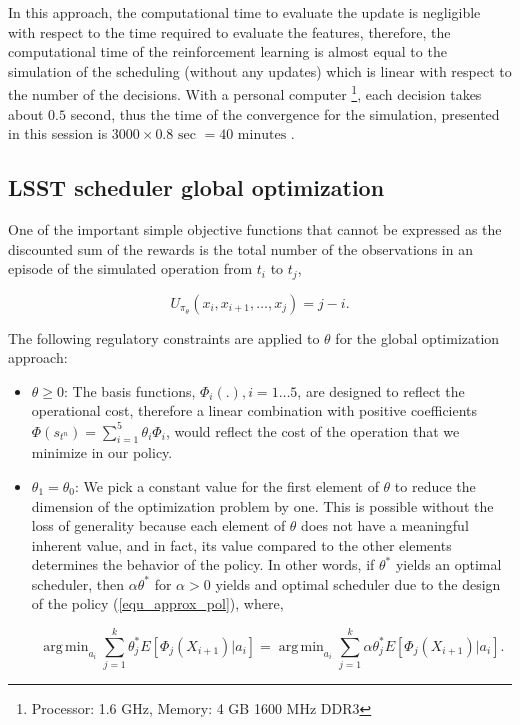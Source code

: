 \documentclass[12pt,aas_macros]{article}
\theoremstyle{definition}
\DeclareMathOperator*{\argmin}{arg\,min}
\begin{document}
In this approach, the computational time to evaluate the update is negligible with respect to the time required to evaluate the features, therefore, the computational time of the reinforcement learning is almost equal to the simulation of the scheduling (without any updates) which is linear with respect to the number of the decisions. With a personal computer \footnote{Processor: 1.6 GHz, Memory: 4 GB 1600 MHz DDR3}, each decision takes about $0.5$ second, thus the time of the convergence for the simulation, presented in this session is $3000\times 0.8 \text{ sec } = 40 \text{ minutes }$.

\subsection{LSST scheduler global optimization}

One of the important simple objective functions that cannot be expressed as the discounted sum of the rewards is the total number of the observations in an episode of the simulated operation from $t_i$ to $t_j$,

\begin{equation}\label{equ_lsst_ede}
U_{\pi_{\theta}}(x_i, x_{i+1}, \dots, x_j) = j - i.
\end{equation}

The following regulatory constraints are applied to $\theta$ for the global optimization approach:

\begin{itemize}
\item $\theta \geq 0$: The basis functions, $\Phi_i(.), i = 1\dots 5$, are designed to reflect the operational cost, therefore a linear combination with positive coefficients $\Phi(s_{t^n})= \sum_{i=1}^5 \theta_i \Phi_i$, would reflect the cost of the operation that we minimize in our policy.

\item $\theta_1 =\theta_0$: We pick a constant value for the first element of $\theta$ to reduce the dimension of the optimization problem by one. This is possible without the loss of generality because each element of $\theta$ does not have a meaningful inherent value, and in fact, its value compared to the other elements determines the behavior of the policy. In other words, if $\theta^*$ yields an optimal scheduler, then $\alpha \theta^*$ for $\alpha > 0$ yields and optimal scheduler due to the design of the policy (\ref{equ_approx_pol}), where, 

\begin{equation*}
\argmin_{a_{i}} \sum_{j=1}^k \theta^*_j E[\Phi_j(X_{i+1}) | a_{i}] = \argmin_{a_{i}} \sum_{j=1}^k \alpha \theta^*_j E[\Phi_j(X_{i+1}) | a_{i}].
\end{equation*}
\end{itemize}
\end{document}
